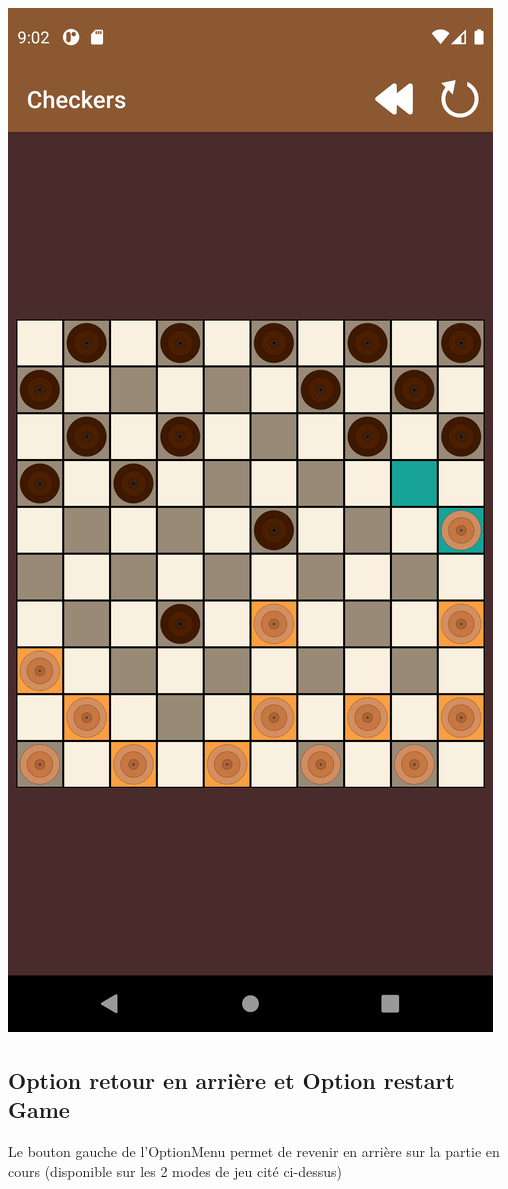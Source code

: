 \documentclass{article}
\begin{document}
\begin{center}
  \includegraphics[scale=0.1]{partie_2.png}
\end{center}

\subsection{Option retour en arrière et Option restart Game}
Le bouton gauche de l'OptionMenu permet de revenir en arrière sur 
la partie en cours (disponible sur les 2 modes de jeu cité ci-dessus)
\end{document}
